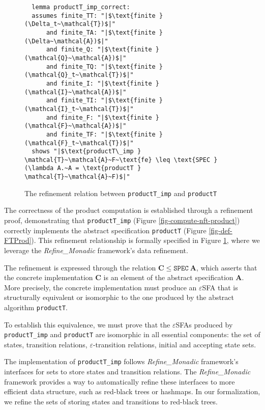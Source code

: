 \documentclass[a4paper,UKenglish,cleveref, autoref, thm-restate]{lipics-v2021}
\begin{document}
  \begin{figure}[hbt!]
    \begin{lstlisting}
  lemma productT_imp_correct:
  assumes finite_TT: "|$\text{finite } (\Delta_t~\mathcal{T})$|"    
      and finite_TA: "|$\text{finite } (\Delta~\mathcal{A})$|"
      and finite_Q: "|$\text{finite } (\mathcal{Q}~\mathcal{A})$|"
      and finite_TQ: "|$\text{finite } (\mathcal{Q}_t~\mathcal{T})$|"
      and finite_I: "|$\text{finite } (\mathcal{I}~\mathcal{A})$|"
      and finite_TI: "|$\text{finite } (\mathcal{I}_t~\mathcal{T})$|"
      and finite_F: "|$\text{finite } (\mathcal{F}~\mathcal{A})$|"
      and finite_TF: "|$\text{finite } (\mathcal{F}_t~\mathcal{T})$|"
  shows "|$\text{productT\_imp } \mathcal{T}~\mathcal{A}~F~\text{fe} \leq \text{SPEC } (\lambda A.~A = \text{productT } \mathcal{T}~\mathcal{A}~F)$|"
  \end{lstlisting}
  \caption{The refinement relation between \texttt{productT\_imp} and \texttt{productT}}
  \label{fig-def-productT_imp_correct}
  \end{figure}

  The correctness of the product computation is established through a refinement proof, demonstrating that \texttt{productT\_imp} (Figure \ref{fig-compute-nft-product}) correctly implements the abstract specification \texttt{productT} (Figure \ref{fig-def-FTProd}). This refinement relationship is formally specified in Figure \ref{fig-def-productT_imp_correct}, where we leverage the \emph{Refine\_Monadic} framework's data refinement.

  The refinement is expressed through the relation $\mathbf{C} \leq \texttt{SPEC}~\mathbf{A}$, which asserts that the concrete implementation $\mathbf{C}$ is an element of the abstract specification $\mathbf{A}$. More precisely,  the concrete implementation must produce an $\varepsilon$SFA that is structurally equivalent or isomorphic to the one produced by the abstract algorithm \texttt{productT}.

  To establish this equivalence, we must prove that the $\varepsilon$SFAs produced by \texttt{productT\_imp} and \texttt{productT} are isomorphic in all essential components: the set of states, transition relations, $\varepsilon$-transition relations, initial and accepting state sets.



The implementation of \texttt{productT\_imp} follows \emph{Refine\_Monadic} framework's interfaces for sets to store states and transition relations. 
The \emph{Refine\_Monadic} framework provides a way to automatically refine these interfaces to more efficient data structure, such as red-black trees or hashmaps. 
In our formalization, we refine the sets of storing states and transitions to red-black trees.
\end{document}
